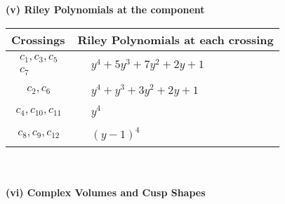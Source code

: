 \documentclass[1p]{elsarticle_modified}
\theoremstyle{definition}
\begin{document}
\newpage\renewcommand{\arraystretch}{1}
\flushleft \textbf{(v) Riley Polynomials at the component}\newline \\
\begin{tabular}{m{50pt}|m{274pt}}
Crossings & \hspace{64pt}Riley Polynomials at each crossing \\
\hline $$\begin{aligned}c_{1},c_{3},c_{5}\\c_{7}\end{aligned}$$&$\begin{aligned}
&y^4+5 y^3+7 y^2+2 y+1
\end{aligned}$\\
\hline $$\begin{aligned}c_{2},c_{6}\end{aligned}$$&$\begin{aligned}
&y^4+y^3+3 y^2+2 y+1
\end{aligned}$\\
\hline $$\begin{aligned}c_{4},c_{10},c_{11}\end{aligned}$$&$\begin{aligned}
&y^4
\end{aligned}$\\
\hline $$\begin{aligned}c_{8},c_{9},c_{12}\end{aligned}$$&$\begin{aligned}
&(y-1)^4
\end{aligned}$\\
\hline
\end{tabular}\\~\\
\newpage\flushleft \textbf{(vi) Complex Volumes and Cusp Shapes}
\end{document}
